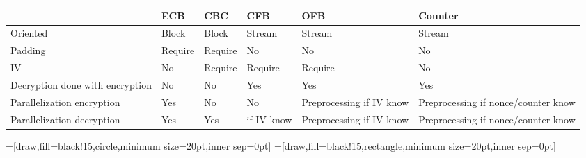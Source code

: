 \begin{center}
    \begin{tabular}{|m{2.5cm}|m{1.5cm}|m{1.5cm}|m{1.5cm}|m{2cm}|m{2.5cm}|}
        \hline
        & \textbf{ECB}        & \textbf{CBC}        & \textbf{CFB}    & \textbf{OFB} & \textbf{Counter} \\
        \hline
        Oriented                   & Block      & Block      & Stream & Stream
        & Stream\\
        Padding                    & Require    & Require    & No & No & No\\
        IV                         & No         & Require    & Require &
        Require & No\\
        \hline
        Decryption done with encryption & No & No & Yes & Yes & Yes \\
        \hline
        Parallelization encryption & Yes        & No         & No &
        Preprocessing if IV know & Preprocessing if nonce/counter know\\
        \hline
        Parallelization decryption & Yes        & Yes        & if IV know &
        Preprocessing if IV know & Preprocessing if nonce/counter know\\
        \hline
    \end{tabular}
\end{center}

=[draw,fill=black!15,circle,minimum size=20pt,inner sep=0pt]
=[draw,fill=black!15,rectangle,minimum size=20pt,inner sep=0pt]

